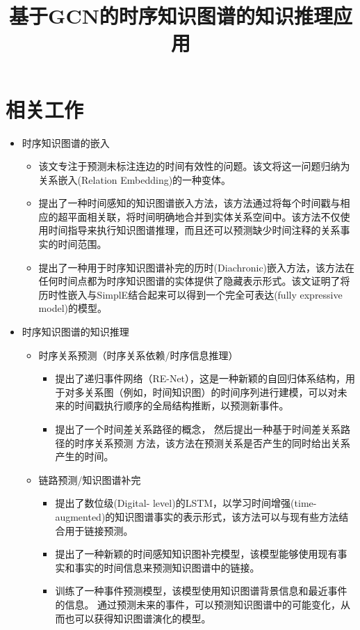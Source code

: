 \documentclass[UTF8]{article}
\title{基于GCN的时序知识图谱的知识推理应用}
\date{}
\begin{document}
\maketitle

\section*{相关工作}
\begin{itemize}
	\item 时序知识图谱的嵌入
	\begin{itemize}
		\item \cite{leblay2018deriving}该文专注于预测未标注连边的时间有效性的问题。该文将这一问题归纳为关系嵌入(Relation Embedding)的一种变体。
		\item \cite{dasgupta2018hyte}提出了一种时间感知的知识图谱嵌入方法，该方法通过将每个时间戳与相应的超平面相关联，将时间明确地合并到实体关系空间中。该方法不仅使用时间指导来执行知识图谱推理，而且还可以预测缺少时间注释的关系事实的时间范围。
		\item \cite{goel2019diachronic}提出了一种用于时序知识图谱补完的历时(Diachronic)嵌入方法，该方法在任何时间点都为时序知识图谱的实体提供了隐藏表示形式。该文证明了将历时性嵌入与SimplE结合起来可以得到一个完全可表达(fully expressive model)的模型。
	\end{itemize}
	\item 时序知识图谱的知识推理
	\begin{itemize}
		\item 时序关系预测（时序关系依赖/时序信息推理）
		\begin{itemize}
			\item \cite{jin2019recurrent}提出了递归事件网络（RE-Net），这是一种新颖的自回归体系结构，用于对多关系图（例如，时间知识图）的时间序列进行建模，可以对未来的时间戳执行顺序的全局结构推断，以预测新事件。
			\item \cite{赵泽亚2015基于动态异构信息网络的时序关系预测}提出了一个时间差关系路径的概念， 然后提出一种基于时间差关系路径的时序关系预测 方法，该方法在预测关系是否产生的同时给出关系 产生的时间。

		\end{itemize}
		\item 链路预测/知识图谱补完
		\begin{itemize}
			\item \cite{garcia2018learning}提出了数位级(Digital- level)的LSTM，以学习时间增强(time-augmented)的知识图谱事实的表示形式，该方法可以与现有些方法结合用于链接预测。
			\item \cite{jiang2016towards}提出了一种新颖的时间感知知识图补完模型，该模型能够使用现有事实和事实的时间信息来预测知识图谱中的链接。
			\item \cite{esteban2016predicting}训练了一种事件预测模型，该模型使用知识图谱背景信息和最近事件的信息。 通过预测未来的事件，可以预测知识图谱中的可能变化，从而也可以获得知识图谱演化的模型。
		\end{itemize}



\end{itemize}
\end{itemize}
\end{document}
